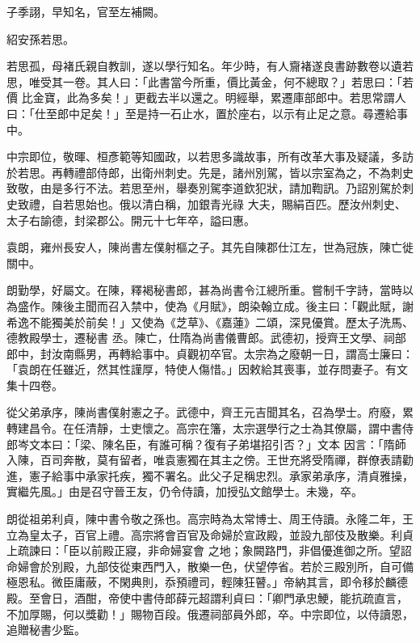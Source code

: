 \begin{pinyinscope}
 子季詡，早知名，官至左補闕。



 紹安孫若思。



 若思孤，母褚氏親自教訓，遂以學行知名。年少時，有人齎褚遂良書跡數卷以遺若思，唯受其一卷。其人曰：「此書當今所重，價比黃金，何不總取？」若思曰：「若價
 比金寶，此為多矣！」更截去半以還之。明經舉，累遷庫部郎中。若思常謂人曰：「仕至郎中足矣！」至是持一石止水，置於座右，以示有止足之意。尋遷給事中。



 中宗即位，敬暉、桓彥範等知國政，以若思多識故事，所有改革大事及疑議，多訪於若思。再轉禮部侍郎，出衛州刺史。先是，諸州別駕，皆以宗室為之，不為刺史致敬，由是多行不法。若思至州，舉奏別駕李道欽犯狀，請加鞫訊。乃詔別駕於刺史致禮，自若思始也。俄以清白稱，加銀青光祿
 大夫，賜絹百匹。歷汝州刺史、太子右諭德，封梁郡公。開元十七年卒，謚曰惠。



 袁朗，雍州長安人，陳尚書左僕射樞之子。其先自陳郡仕江左，世為冠族，陳亡徙關中。



 朗勤學，好屬文。在陳，釋褐秘書郎，甚為尚書令江總所重。嘗制千字詩，當時以為盛作。陳後主聞而召入禁中，使為《月賦》，朗染翰立成。後主曰：「觀此賦，謝希逸不能獨美於前矣！」又使為《芝草》、《嘉蓮》二頌，深見優賞。歷太子洗馬、德教殿學士，遷秘書
 丞。陳亡，仕隋為尚書儀曹郎。武德初，授齊王文學、祠部郎中，封汝南縣男，再轉給事中。貞觀初卒官。太宗為之廢朝一日，謂高士廉曰：「袁朗在任雖近，然其性謹厚，特使人傷惜。」因敕給其喪事，並存問妻子。有文集十四卷。



 從父弟承序，陳尚書僕射憲之子。武德中，齊王元吉聞其名，召為學士。府廢，累轉建昌令。在任清靜，士吏懷之。高宗在籓，太宗選學行之士為其僚屬，謂中書侍郎岑文本曰：「梁、陳名臣，有誰可稱？復有子弟堪招引否？」文本
 因言：「隋師入陳，百司奔散，莫有留者，唯袁憲獨在其主之傍。王世充將受隋禪，群僚表請勸進，憲子給事中承家托疾，獨不署名。此父子足稱忠烈。承家弟承序，清貞雅操，實繼先風。」由是召守晉王友，仍令侍讀，加授弘文館學士。未幾，卒。



 朗從祖弟利貞，陳中書令敬之孫也。高宗時為太常博士、周王侍讀。永隆二年，王立為皇太子，百官上禮。高宗將會百官及命婦於宣政殿，並設九部伎及散樂。利貞上疏諫曰：「臣以前殿正寢，非命婦宴會
 之地；象闕路門，非倡優進御之所。望詔命婦會於別殿，九部伎從東西門入，散樂一色，伏望停省。若於三殿別所，自可備極恩私。微臣庸蔽，不閑典則，忝預禮司，輕陳狂瞽。」帝納其言，即令移於麟德殿。至會日，酒酣，帝使中書侍郎薛元超謂利貞曰：「卿門承忠鯁，能抗疏直言，不加厚賜，何以獎勸！」賜物百段。俄遷祠部員外郎，卒。中宗即位，以侍讀恩，追贈秘書少監。




\end{pinyinscope}
